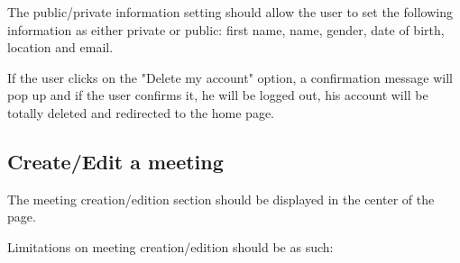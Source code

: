 \documentclass[conference]{IEEEtran}
\begin{document}
The public/private information setting should allow the user to set the following information as either private or public: first name, name, gender, date of birth, location and email.

If the user clicks on the "Delete my account" option, a confirmation message will pop up and if the user confirms it, he will be logged out, his account will be totally deleted and redirected to the home page.

\subsection{Create/Edit a meeting}

The meeting creation/edition section should be displayed in the center of the page.

Limitations on meeting creation/edition should be as such:
\end{document}
